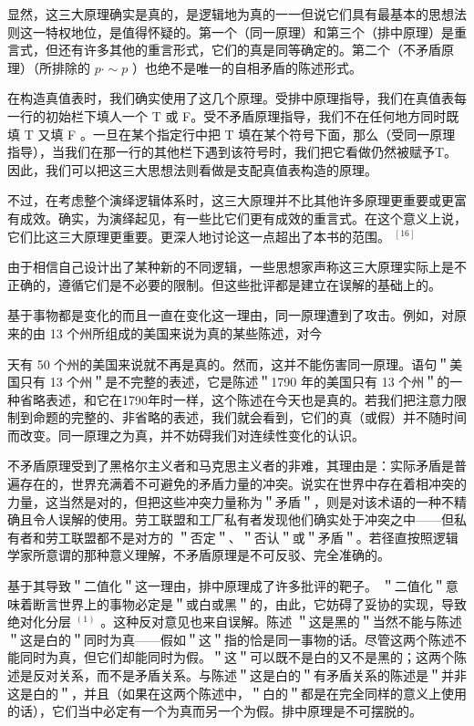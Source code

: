 显然，这三大原理确实是真的，是逻辑地为真的一一但说它们具有最基本的思想法则这一特权地位，是值得怀疑的。第一个（同一原理）和第三个（排中原理）是重言式，但还有许多其他的重言形式，它们的真是同等确定的。第二个（不矛盾原理）（所排除的 $p \cdot \sim p$ ）也绝不是唯一的自相矛盾的陈述形式。

在构造真值表时，我们确实使用了这几个原理。受排中原理指导，我们在真值表每一行的初始栏下填人一个 T 或 F。受不矛盾原理指导，我们不在任何地方同时既填 T 又填 F 。一旦在某个指定行中把 T 填在某个符号下面，那么（受同一原理指导），当我们在那一行的其他栏下遇到该符号时，我们把它看做仍然被赋予T。因此，我们可以把这三大思想法则看做是支配真值表构造的原理。

不过，在考虑整个演绎逻辑体系时，这三大原理并不比其他许多原理更重要或更富有成效。确实，为演绎起见，有一些比它们更有成效的重言式。在这个意义上说，它们比这三大原理更重要。更深人地讨论这一点超出了本书的范围。 ${ }^{[16]}$

由于相信自己设计出了某种新的不同逻辑，一些思想家声称这三大原理实际上是不正确的，遵循它们是不必要的限制。但这些批评都是建立在误解的基础上的。

基于事物都是变化的而且一直在变化这一理由，同一原理遭到了攻击。例如，对原来的由 13 个州所组成的美国来说为真的某些陈述，对今

天有 50 个州的美国来说就不再是真的。然而，这并不能伤害同一原理。语句＂美国只有 13 个州＂是不完整的表述，它是陈述＂1790 年的美国只有 13 个州＂的一种省略表述，和它在1790年时一样，这个陈述在今天也是真的。若我们把注意力限制到命题的完整的、非省略的表述，我们就会看到，它们的真（或假）并不随时间而改变。同一原理之为真，并不妨碍我们对连续性变化的认识。

不矛盾原理受到了黑格尔主义者和马克思主义者的非难，其理由是：实际矛盾是普遍存在的，世界充满着不可避免的矛盾力量的冲突。说实在世界中存在着相冲突的力量，这当然是对的，但把这些冲突力量称为＂矛盾＂，则是对该术语的一种不精确且令人误解的使用。劳工联盟和工厂私有者发现他们确实处于冲突之中——但私有者和劳工联盟都不是对方的 ＂否定＂、＂否认＂或＂矛盾＂。若径直按照逻辑学家所意谓的那种意义理解，不矛盾原理是不可反驳、完全准确的。

基于其导致＂二值化＂这一理由，排中原理成了许多批评的靶子。 ＂二值化＂意味着断言世界上的事物必定是＂或白或黑＂的，由此，它妨碍了妥协的实现，导致绝对化分层 ${ }^{(1)}$ 。这种反对意见也来自误解。陈述 ＂这是黑的＂当然不能与陈述＂这是白的＂同时为真——假如＂这＂指的恰是同一事物的话。尽管这两个陈述不能同时为真，但它们却能同时为假。＂这＂可以既不是白的又不是黑的；这两个陈述是反对关系，而不是矛盾关系。与陈述＂这是白的＂有矛盾关系的陈述是＂并非这是白的＂，并且（如果在这两个陈述中，＂白的＂都是在完全同样的意义上使用的话），它们当中必定有一个为真而另一个为假。排中原理是不可摆脱的。


